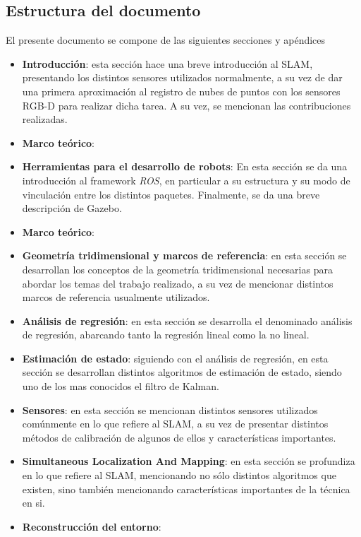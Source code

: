 \subsection{Estructura del documento}
El presente documento se compone de las siguientes secciones
\ifimagenespaper
\else
y apéndices
\fi
\begin{itemize}
    \item \textbf{Introducción}: esta sección hace una breve introducción al SLAM, presentando los distintos sensores utilizados normalmente, a su vez de dar una primera aproximación al registro de nubes de puntos con los sensores RGB-D para realizar dicha tarea. A su vez, se mencionan las contribuciones realizadas.
    \ifimagenespaper
    \item \textbf{Marco teórico}:
    \else
    \item \textbf{Herramientas para el desarrollo de robots}: En esta sección se da una introducción al framework \textit{ROS}, en particular a su estructura y su modo de vinculación entre los distintos paquetes. Finalmente, se da una breve descripción de Gazebo.
        \ifimagenes
    \item \textbf{Marco teórico}:
        \else
    \item \textbf{Geometría tridimensional y marcos de referencia}: en esta sección se desarrollan los conceptos de la geometría tridimensional necesarias para abordar los temas del trabajo realizado, a su vez de mencionar distintos marcos de referencia usualmente utilizados.
    \item \textbf{Análisis de regresión}: en esta sección se desarrolla el denominado análisis de regresión, abarcando tanto la regresión lineal como la no lineal.
    \item \textbf{Estimación de estado}: siguiendo con el análisis de regresión, en esta sección se desarrollan distintos algoritmos de estimación de estado, siendo uno de los mas conocidos el filtro de Kalman.
    \item \textbf{Sensores}: en esta sección se mencionan distintos sensores utilizados comúnmente en lo que refiere al SLAM, a su vez de presentar distintos métodos de calibración de algunos de ellos y características importantes.
    \item \textbf{Simultaneous Localization And Mapping}: en esta sección se profundiza en lo que refiere al SLAM, mencionando no sólo distintos algoritmos que existen, sino también mencionando características importantes de la técnica en si.
    \item \textbf{Reconstrucción del entorno}:

\end{itemize}

